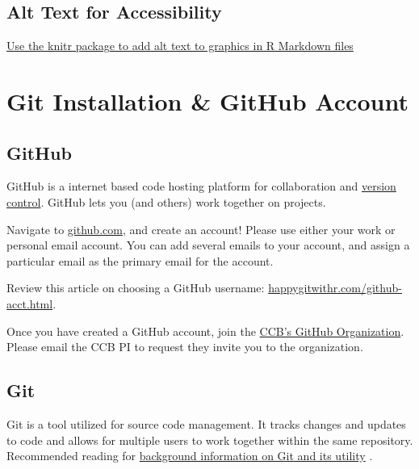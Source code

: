 \documentclass[
]{book}
\begin{document}
\hypertarget{alt-text-for-accessibility}{%
\section{Alt Text for Accessibility}\label{alt-text-for-accessibility}}

\href{https://www.rstudio.com/blog/knitr-fig-alt/}{Use the knitr package to add alt text to graphics in R Markdown files}

\hypertarget{git}{%
\chapter{Git Installation \& GitHub Account}\label{git}}

\hypertarget{github}{%
\section{GitHub}\label{github}}

GitHub is a internet based code hosting platform for collaboration and \href{https://www.atlassian.com/git/tutorials/what-is-version-control\#:~:text=Version\%20control\%2C\%20also\%20known\%20as,to\%20source\%20code\%20over\%20time.}{version control}. GitHub lets you (and others) work together on projects.

Navigate to \href{https://github.com/}{github.com}, and create an account! Please use either your work or personal email account. You can add several emails to your account, and assign a particular email as the primary email for the account.

Review this article on choosing a GitHub username: \url{happygitwithr.com/github-acct.html}.

Once you have created a GitHub account, join the \href{https://github.com/ccbucr}{CCB's GitHub Organization}. Please email the CCB PI to request they invite you to the organization.

\hypertarget{git-1}{%
\section{Git}\label{git-1}}

Git is a tool utilized for source code management. It tracks changes and updates to code and allows for multiple users to work together within the same repository. Recommended reading for \href{https://towardsdatascience.com/what-is-git-and-why-is-it-so-important-dce559b27833}{background information on Git and its utility} \citep{Yıldırım_2020}.
\end{document}
